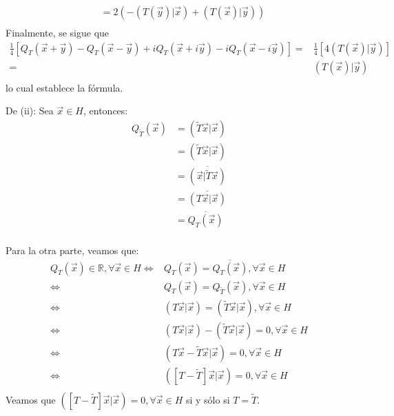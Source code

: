 \documentclass[12pt]{report}
\theoremstyle{largebreak}
\newcommand\adj[1]{\ensuremath{\widetilde{#1}}}
\newcommand\pint[2]{\ensuremath{\left(#1\big|#2\right)}}
\newcommand\conj[1]{\ensuremath{\overline{#1}}}
\begin{document}
\begin{sol}
\begin{equation*}
\begin{split}
                &=2\left(-\pint{T(\vec{y})}{\vec{x}}+\pint{T(\vec{x})}{\vec{y}}\right)\\
            \end{split}
        \end{equation*}
        Finalmente, se sigue que
        \begin{equation*}
            \begin{split}
                \frac{1}{4}\left[Q_T(\vec{x}+\vec{y})-Q_T(\vec{x}-\vec{y})+iQ_T(\vec{x}+i\vec{y})-iQ_T(\vec{x}-i\vec{y})\right]=&\frac{1}{4}\left[4\pint{T(\vec{x})}{\vec{y}}\right] \\
                =&\pint{T(\vec{x})}{\vec{y}}\\
            \end{split}
        \end{equation*}
        lo cual establece la fórmula.

        De (ii): Sea $\vec{x}\in H$, entonces:
        \begin{equation*}
            \begin{split}
                Q_{\adj{T}}(\vec{x})&=\pint{\adj{T}\vec{x}}{\vec{x}}\\
                &=\pint{\adj{T}\vec{x}}{\vec{x}}\\
                &=\conj{\pint{\vec{x}}{\adj{T}\vec{x}}}\\
                &=\conj{\pint{T\vec{x}}{\vec{x}}}\\
                &=\conj{Q_T(\vec{x})}\\
            \end{split}
        \end{equation*}

        Para la otra parte, veamos que:
        \begin{equation*}
            \begin{split}
                Q_T(\vec{x})\in\mathbb{R},\forall\vec{x}\in H\iff&Q_T(\vec{x})=\conj{Q_T(\vec{x})},\forall\vec{x}\in H\\
                \iff&Q_T(\vec{x})=Q_{\adj{T}}(\vec{x}),\forall\vec{x}\in H\\
                \iff&\pint{T\vec{x}}{\vec{x}}=\pint{\adj{T}\vec{x}}{\vec{x}},\forall\vec{x}\in H\\
                \iff&\pint{T\vec{x}}{\vec{x}}-\pint{\adj{T}\vec{x}}{\vec{x}}=0,\forall\vec{x}\in H\\
                \iff&\pint{T\vec{x}-\adj{T}\vec{x}}{\vec{x}}=0,\forall\vec{x}\in H\\
                \iff&\pint{\left[T-\adj{T}\right]\vec{x}}{\vec{x}}=0,\forall\vec{x}\in H\\
            \end{split}
        \end{equation*}
        Veamos que $\pint{\left[T-\adj{T}\right]\vec{x}}{\vec{x}}=0,\forall\vec{x}\in H$ si y sólo si $T=\adj{T}$.


\end{sol}
\end{document}
